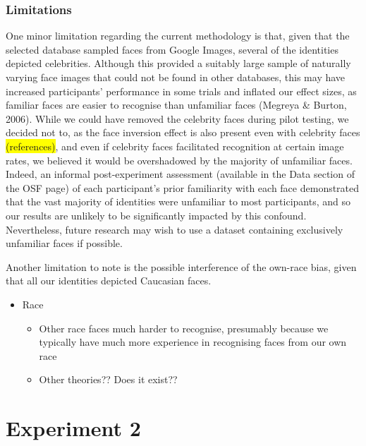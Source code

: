 \documentclass[
  english,
  man]{apa6}
\providecommand{\tightlist}{%
  \setlength{\itemsep}{0pt}\setlength{\parskip}{0pt}}
\begin{document}
\hypertarget{limitations}{%
\subsubsection{Limitations}\label{limitations}}

One minor limitation regarding the current methodology is that, given that the selected database sampled faces from Google Images, several of the identities depicted celebrities. Although this provided a suitably large sample of naturally varying face images that could not be found in other databases, this may have increased participants' performance in some trials and inflated our effect sizes, as familiar faces are easier to recognise than unfamiliar faces (Megreya \& Burton, 2006). While we could have removed the celebrity faces during pilot testing, we decided not to, as the face inversion effect is also present even with celebrity faces \colorbox{yellow}{(references)}, and even if celebrity faces facilitated recognition at certain image rates, we believed it would be overshadowed by the majority of unfamiliar faces. Indeed, an informal post-experiment assessment (available in the Data section of the OSF page) of each participant's prior familiarity with each face demonstrated that the vast majority of identities were unfamiliar to most participants, and so our results are unlikely to be significantly impacted by this confound. Nevertheless, future research may wish to use a dataset containing exclusively unfamiliar faces if possible.

Another limitation to note is the possible interference of the own-race bias, given that all our identities depicted Caucasian faces.

\begin{itemize}
\tightlist
\item
  Race

  \begin{itemize}
  \tightlist
  \item
    Other race faces much harder to recognise, presumably because we typically have much more experience in recognising faces from our own race
  \item
    Other theories?? Does it exist??
  \end{itemize}
\end{itemize}

\hypertarget{experiment-2}{%
\section{Experiment 2}\label{experiment-2}}
\end{document}
